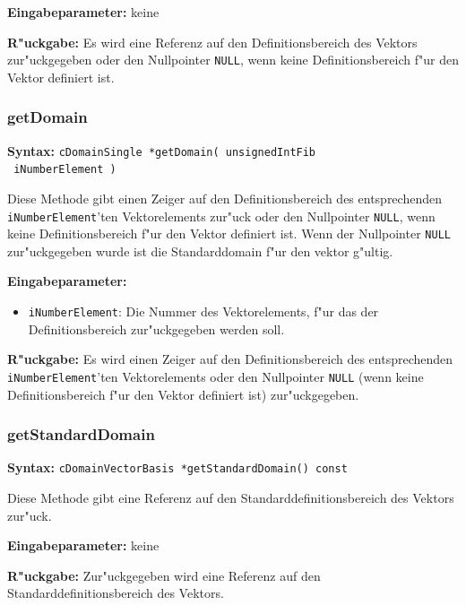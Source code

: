 \bigskip\noindent
\textbf{Eingabeparameter:} keine

\bigskip\noindent
\textbf{R"uckgabe:} Es wird eine Referenz auf den Definitionsbereich des Vektors zur"uckgegeben oder den Nullpointer \verb|NULL|, wenn keine Definitionsbereich f"ur den Vektor definiert ist.


\subsubsection{getDomain}

\textbf{Syntax:} \verb|cDomainSingle *getDomain( unsignedIntFib| \\\verb| iNumberElement )|

\bigskip\noindent
Diese Methode gibt einen Zeiger auf den Definitionsbereich des entsprechenden \verb|iNumberElement|'ten Vektorelements zur"uck oder den Nullpointer \verb|NULL|, wenn keine Definitionsbereich f"ur den Vektor definiert ist.
Wenn der Nullpointer \verb|NULL| zur"uckgegeben wurde ist die Standarddomain f"ur den vektor g"ultig.

\bigskip\noindent
\textbf{Eingabeparameter:}
\begin{itemize}
 \item \verb|iNumberElement|: Die Nummer des Vektorelements, f"ur das der Definitionsbereich zur"uckgegeben werden soll.
\end{itemize}

\bigskip\noindent
\textbf{R"uckgabe:} Es wird einen Zeiger auf den Definitionsbereich des entsprechenden \verb|iNumberElement|'ten Vektorelements oder den Nullpointer \verb|NULL| (wenn keine Definitionsbereich f"ur den Vektor definiert ist) zur"uckgegeben.


\subsubsection{getStandardDomain}

\textbf{Syntax:} \verb|cDomainVectorBasis *getStandardDomain() const|

\bigskip\noindent
Diese Methode gibt eine Referenz auf den Standarddefinitionsbereich des Vektors zur"uck.

\bigskip\noindent
\textbf{Eingabeparameter:} keine

\bigskip\noindent
\textbf{R"uckgabe:} Zur"uckgegeben wird eine Referenz auf den Standarddefinitionsbereich des Vektors.



